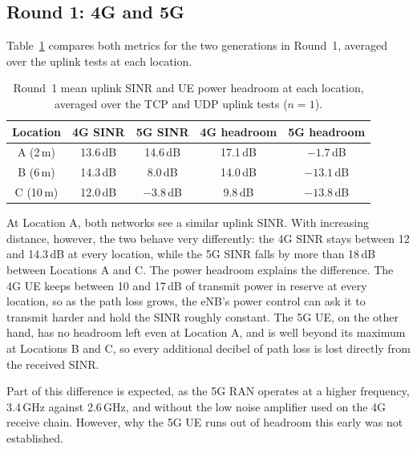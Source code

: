 \subsection{Round 1: 4G and 5G}
\label{sec:round-1-link-quality}

Table~\ref{tab:r1-link-quality} compares both metrics for the two generations in Round~1, averaged over the uplink tests at each location.

\begin{table}[htbp]
    \centering
    \begin{tabular}{|c|c|c|c|c|}
        \hline
        \textbf{Location} & \textbf{4G SINR} & \textbf{5G SINR} & \textbf{4G headroom} & \textbf{5G headroom} \\
        \hline
        A (2\,m) & 13.6\,dB & 14.6\,dB & 17.1\,dB & $-1.7$\,dB \\
        \hline
        B (6\,m) & 14.3\,dB & 8.0\,dB & 14.0\,dB & $-13.1$\,dB \\
        \hline
        C (10\,m) & 12.0\,dB & $-3.8$\,dB & 9.8\,dB & $-13.8$\,dB \\
        \hline
    \end{tabular}
    \caption[Round 1 uplink SINR and UE power headroom.]{Round~1 mean uplink \gls{SINR} and \gls{UE} power headroom at each location, averaged over the TCP and UDP uplink tests ($n=1$).}
    \label{tab:r1-link-quality}
\end{table}

At Location A, both networks see a similar uplink \gls{SINR}. With increasing distance, however, the two behave very differently: the 4G \gls{SINR} stays between 12 and 14.3\,dB at every location, while the 5G \gls{SINR} falls by more than 18\,dB between Locations A and C. The power headroom explains the difference. The 4G \gls{UE} keeps between 10 and 17\,dB of transmit power in reserve at every location, so as the path loss grows, the \gls{eNB}'s power control can ask it to transmit harder and hold the \gls{SINR} roughly constant. The 5G \gls{UE}, on the other hand, has no headroom left even at Location A, and is well beyond its maximum at Locations B and C, so every additional decibel of path loss is lost directly from the received \gls{SINR}.

Part of this difference is expected, as the 5G \gls{RAN} operates at a higher frequency, 3.4\,GHz against 2.6\,GHz, and without the low noise amplifier used on the 4G receive chain. However, why the 5G \gls{UE} runs out of headroom this early was not established.

